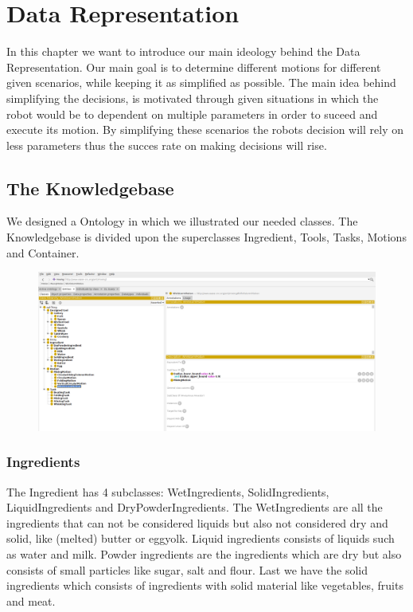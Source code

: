 \chapter{Data Representation}
\label{chap:Data_representation}

In this chapter we want to introduce our main ideology behind the Data Representation. Our main goal is to determine different motions for different given scenarios, while keeping it as simplified as possible.
The main idea behind simplifying the decisions, is motivated through given situations in which the robot would be to dependent on multiple parameters in order to suceed and execute its motion.
By simplifying these scenarios the robots decision will rely on less parameters thus the succes rate on making decisions will rise.

\section*{The Knowledgebase}
We designed a Ontology in which we illustrated our needed classes. 
The Knowledgebase is divided upon the superclasses Ingredient, Tools, Tasks, Motions and Container.
\begin{figure}[H]
\includegraphics[scale=0.3]{Graphics/Ontology.png}
\end{figure}
\subsection*{Ingredients}
The Ingredient has 4 subclasses: WetIngredients, SolidIngredients, LiquidIngredients and DryPowderIngredients.
The WetIngredients are all the ingredients that can not be considered liquids but also not considered dry and solid, like (melted) butter or eggyolk. 
Liquid ingredients consists of liquids such as water and milk. Powder ingredients are the ingredients which are dry but also consists of small particles like sugar, salt and flour.
Last we have the solid ingredients which consists of ingredients with solid material like vegetables, fruits and meat.

